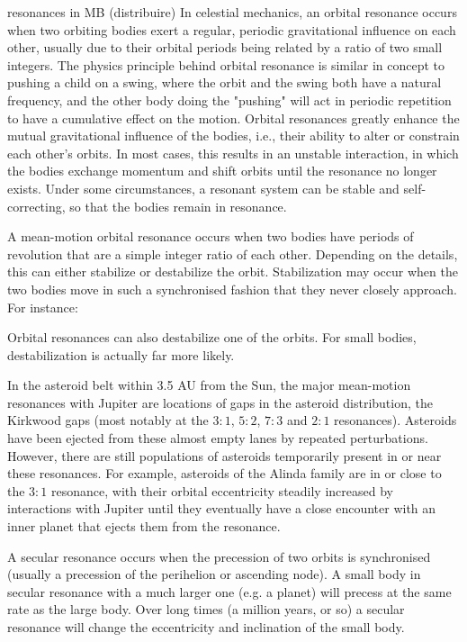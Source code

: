 \begin{wordonframe}{resonances in MB (distribuire)}
In celestial mechanics, an orbital resonance occurs when two orbiting bodies exert a regular, periodic gravitational influence on each other, usually due to their orbital periods being related by a ratio of two small integers. The physics principle behind orbital resonance is similar in concept to pushing a child on a swing, where the orbit and the swing both have a natural frequency, and the other body doing the "pushing" will act in periodic repetition to have a cumulative effect on the motion. Orbital resonances greatly enhance the mutual gravitational influence of the bodies, i.e., their ability to alter or constrain each other's orbits. In most cases, this results in an unstable interaction, in which the bodies exchange momentum and shift orbits until the resonance no longer exists. Under some circumstances, a resonant system can be stable and self-correcting, so that the bodies remain in resonance.

A mean-motion orbital resonance occurs when two bodies have periods of revolution that are a simple integer ratio of each other. Depending on the details, this can either stabilize or destabilize the orbit. Stabilization may occur when the two bodies move in such a synchronised fashion that they never closely approach. For instance:

Orbital resonances can also destabilize one of the orbits. For small bodies, destabilization is actually far more likely.

In the asteroid belt within 3.5 AU from the Sun, the major mean-motion resonances with Jupiter are locations of gaps in the asteroid distribution, the Kirkwood gaps (most notably at the $3:1$, $5:2$, $7:3$ and $2:1$ resonances). Asteroids have been ejected from these almost empty lanes by repeated perturbations. However, there are still populations of asteroids temporarily present in or near these resonances. For example, asteroids of the Alinda family are in or close to the $3:1$ resonance, with their orbital eccentricity steadily increased by interactions with Jupiter until they eventually have a close encounter with an inner planet that ejects them from the resonance.

A secular resonance occurs when the precession of two orbits is synchronised (usually a precession of the perihelion or ascending node). A small body in secular resonance with a much larger one (e.g. a planet) will precess at the same rate as the large body. Over long times (a million years, or so) a secular resonance will change the eccentricity and inclination of the small body.
\end{wordonframe}

